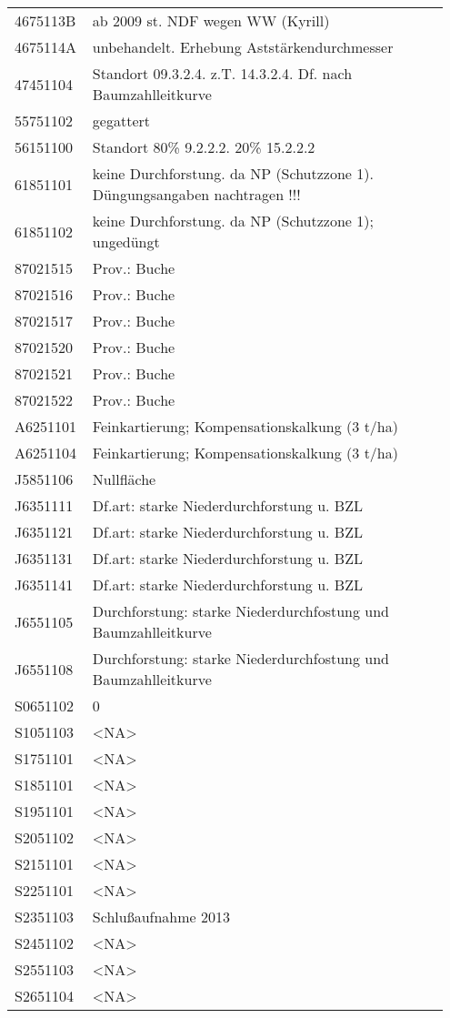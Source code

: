 \begin{singlespace}
{\begin{longtabu}{p{0.15\linewidth} p{0.8\linewidth}}
      4675113B & ab  2009 st. NDF wegen WW (Kyrill) \\
      4675114A & unbehandelt. Erhebung Aststärkendurchmesser \\
      47451104 & Standort 09.3.2.4. z.T. 14.3.2.4. Df. nach Baumzahlleitkurve \\
      55751102 & gegattert \\
      56151100 & Standort 80\% 9.2.2.2. 20\% 15.2.2.2 \\
      61851101 & keine Durchforstung. da NP (Schutzzone 1). Düngungsangaben nachtragen !!! \\
      61851102 & keine Durchforstung. da NP (Schutzzone 1); ungedüngt \\
      87021515 & Prov.: Buche \\
      87021516 & Prov.: Buche \\
      87021517 & Prov.: Buche \\
      87021520 & Prov.: Buche \\
      87021521 & Prov.: Buche \\
      87021522 & Prov.: Buche \\
      A6251101 & Feinkartierung; Kompensationskalkung (3 t/ha) \\
      A6251104 & Feinkartierung; Kompensationskalkung (3 t/ha) \\
      J5851106 & Nullfläche \\
      J6351111 & Df.art: starke Niederdurchforstung u. BZL \\
      J6351121 & Df.art: starke Niederdurchforstung u. BZL \\
      J6351131 & Df.art: starke Niederdurchforstung u. BZL \\
      J6351141 & Df.art: starke Niederdurchforstung u. BZL \\
      J6551105 & Durchforstung: starke Niederdurchfostung und Baumzahlleitkurve \\
      J6551108 & Durchforstung: starke Niederdurchfostung und Baumzahlleitkurve \\
      S0651102 & 0 \\
      S1051103 & <NA> \\
      S1751101 & <NA> \\
      S1851101 & <NA> \\
      S1951101 & <NA> \\
      S2051102 & <NA> \\
      S2151101 & <NA> \\
      S2251101 & <NA> \\
      S2351103 & Schlußaufnahme 2013 \\
      S2451102 & <NA> \\
      S2551103 & <NA> \\
      S2651104 & <NA> \\
    \end{longtabu}
  }
\end{singlespace}


